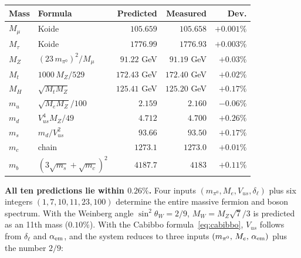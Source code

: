 \documentclass[11pt]{article}
\begin{document}
\begin{center}\small
\begin{tabular}{@{}l l r r r@{}}
\toprule
Mass & Formula & Predicted & Measured & Dev. \\
\midrule
$M_\mu$ & Koide & $105.659$ & $105.658$ & $+0.001\%$ \\
$M_\tau$ & Koide & $1776.99$ & $1776.93$ & $+0.003\%$ \\
$M_Z$ & $(23\,m_{\pi^0})^2\!/M_\mu$ & $91.22$ GeV & $91.19$ GeV & $+0.03\%$ \\
$M_t$ & $1000\,M_Z/529$ & $172.43$ GeV & $172.40$ GeV & $+0.02\%$ \\
$M_H$ & $\sqrt{M_t M_Z}$ & $125.41$ GeV & $125.20$ GeV & $+0.17\%$ \\
$m_u$ & $\sqrt{M_e M_Z}\!/100$ & $2.159$ & $2.160$ & $-0.06\%$ \\
$m_d$ & $V_{us}^4 M_Z\!/49$ & $4.712$ & $4.700$ & $+0.26\%$ \\
$m_s$ & $m_d/V_{us}^2$ & $93.66$ & $93.50$ & $+0.17\%$ \\
$m_c$ & chain & $1273.1$ & $1273.0$ & $+0.01\%$ \\
$m_b$ & $(3\sqrt{m_s}\!+\!\sqrt{m_c})^2$ & $4187.7$ & $4183$ & $+0.11\%$ \\
\bottomrule
\end{tabular}
\end{center}

\noindent
\textbf{All ten predictions lie within $0.26\%$.}
Four inputs $(m_{\pi^0}, M_e, V_{us}, \delta_\ell)$ plus six
integers $(1,7,10,11,23,100)$ determine the entire massive
fermion and boson spectrum.
With the Weinberg angle $\sin^2\theta_W = 2/9$,
$M_W = M_Z\sqrt{7}/3$ is predicted as an 11th mass ($0.10\%$).
With the Cabibbo formula~\eqref{eq:cabibbo},
$V_{us}$ follows from $\delta_\ell$ and $\alpha_{\rm em}$,
and the system reduces to three inputs
$(m_{\pi^0},\,M_e,\,\alpha_{\rm em})$ plus the number $2/9$:
\end{document}
